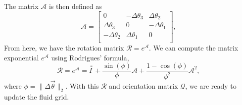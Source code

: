 The matrix $\mathcal{A}$ is then defined as 
\begin{equation}
	\mathcal{A}
	=\begin{bmatrix}
	 0 & - \Delta \theta_3 & \Delta \theta_2  \\
	 \Delta \theta_3 & 0  & -\Delta \theta_1  \\
	 - \Delta \theta_2 & \Delta \theta_1 & 0  \\
	\end{bmatrix},
	\label{eq_rotation_mx}
\end{equation}
From here, we have the rotation matrix $\mathcal{R} = e^{\mathcal{A}}.$
We can compute the matrix exponential $e^{\mathcal{A}}$ using Rodrigues' formula,
\begin{equation}
	\mathcal{R} = 
e^{\mathcal{A}} 
 = \bar{\bar{I \ }} 
 + \frac{\sin(\phi)}{\phi} \mathcal{A}
 + \frac{1-\cos(\phi)}{\phi^2} \mathcal{A}^2,
\label{eq_R_eA}
\end{equation} 
where $\phi = \|\Delta \vec{\theta}\|_2$.
With this $\mathcal{R}$ and orientation matrix $\mathcal{Q}$, we are ready to update the fluid grid.


	
